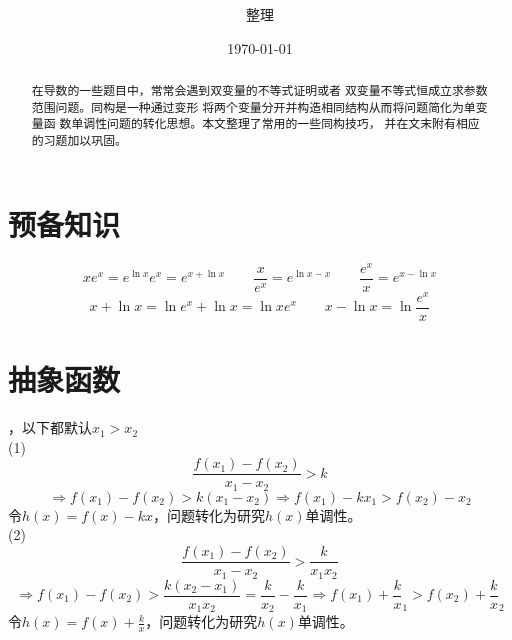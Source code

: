 \documentclass[UTF8,a4paper]{ctexart}
\title{\bfseries{\zihao{1}\heiti{同构在导数中的应用}}}
\author{\kaishu{宋和德}{ }整理}
\date{\today}
\begin{document}
\maketitle
\begin{abstract}
    在导数的一些题目中，常常会遇到双变量的不等式证明或者
    双变量不等式恒成立求参数范围问题。同构是一种通过变形
    将两个变量分开并构造相同结构从而将问题简化为单变量函
    数单调性问题的转化思想。本文整理了常用的一些同构技巧，
    并在文末附有相应的习题加以巩固。
\end{abstract}
\section*{预备知识}

\[
    xe^x=e^{\ln x}e^x=e^{x+\ln x}\qquad\frac{x}{e^x}=e^{\ln x-x}\qquad\frac{e^x}{x}=e^{x-\ln x}
\]
\[
    x+\ln x=\ln e^x+\ln x=\ln xe^x\qquad x-\ln x=\ln \frac{e^x}{x}
\]
\section{抽象函数}
，以下都默认$x_1>x_2$\\
(1)
\[\frac{f(x_1)-f(x_2)}{x_1-x_2} > k\]
\[
    \Rightarrow f(x_1)-f(x_2)>k(x_1-x_2)\Rightarrow
    f(x_1)-kx_1>f(x_2)-x_2
\]
令$h(x)=f(x)-kx$，问题转化为研究$h(x)$单调性。\\
(2)
\[\frac{f(x_1)-f(x_2)}{x_1-x_2}>\frac{k}{x_1x_2}\]
\[
    \Rightarrow f(x_1)-f(x_2)>\frac{k(x_2-x_1)}{x_1x_2}
    =\frac{k}{x_2}-\frac{k}{x_1}\Rightarrow
    f(x_1)+\frac k x_1>f(x_2)+\frac k x_2
\]
令$h(x)=f(x)+\frac k x$，问题转化为研究$h(x)$单调性。\\
\end{document}
